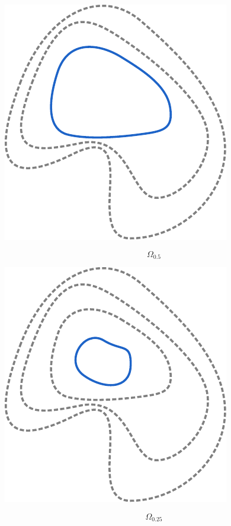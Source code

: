 \documentclass[crop, fleqn]{standalone}
\begin{document}
\begin{minipage}{60pt}
    \includegraphics[width=\linewidth]{main-theorem/omega-3.pdf}

    \vspace*{-30pt}

    \[ \Omega_{0.5} \]

    \vspace*{2pt}
\end{minipage}
\hspace{3pt}
\begin{minipage}{60pt}
    \includegraphics[width=\linewidth]{main-theorem/omega-4.pdf}

    \vspace*{-30pt}

    \[ \Omega_{0.25} \]

    \vspace*{2pt}
\end{minipage}
\end{document}
